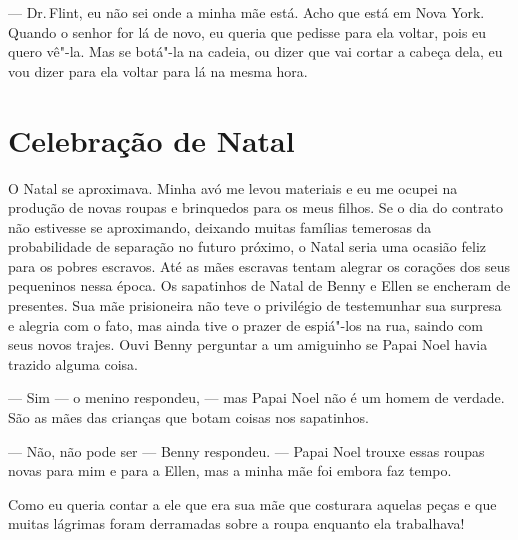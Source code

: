 --- Dr.\,Flint, eu não sei onde a minha mãe está. Acho que está em Nova
York. Quando o senhor for lá de novo, eu queria que pedisse para ela
voltar, pois eu quero vê"-la. Mas se botá"-la na cadeia, ou dizer que vai
cortar a cabeça dela, eu vou dizer para ela voltar para lá na mesma
hora.

\chapter*{Celebração de Natal}

O Natal se aproximava. Minha avó me
levou materiais e eu me ocupei na produção de novas roupas e brinquedos
para os meus filhos. Se o dia do contrato não estivesse se aproximando,
deixando muitas famílias temerosas da probabilidade de separação no
futuro próximo, o Natal seria uma ocasião feliz para os pobres escravos.
Até as mães escravas tentam alegrar os corações dos seus pequeninos
nessa época. Os sapatinhos de Natal de Benny e Ellen se encheram de
presentes. Sua mãe prisioneira não teve o privilégio de testemunhar sua
surpresa e alegria com o fato, mas ainda tive o prazer de espiá"-los na
rua, saindo com seus novos trajes. Ouvi Benny perguntar a um amiguinho
se Papai Noel havia trazido alguma coisa.

--- Sim --- o menino respondeu, --- mas Papai Noel não é um homem de
verdade. São as mães das crianças que botam coisas nos sapatinhos.

--- Não, não pode ser --- Benny respondeu. --- Papai Noel trouxe essas
roupas novas para mim e para a Ellen, mas a minha mãe foi embora faz
tempo.

Como eu queria contar a ele que era sua
mãe que costurara aquelas peças e que muitas lágrimas foram derramadas
sobre a roupa enquanto ela trabalhava!

